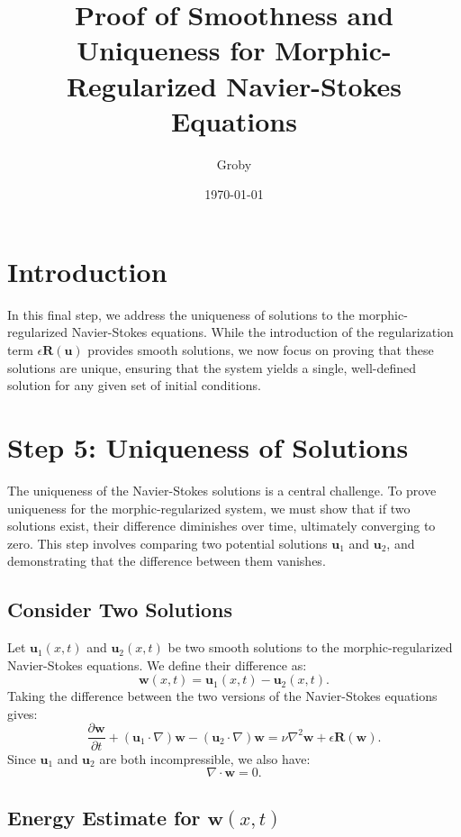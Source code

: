 \documentclass{article}
\title{Proof of Smoothness and Uniqueness for Morphic-Regularized Navier-Stokes Equations}
\author{Groby}
\date{\today}
\begin{document}
\maketitle

\section*{Introduction}

In this final step, we address the uniqueness of solutions to the morphic-regularized Navier-Stokes equations. While the introduction of the regularization term \( \epsilon \mathbf{R}(\mathbf{u}) \) provides smooth solutions, we now focus on proving that these solutions are unique, ensuring that the system yields a single, well-defined solution for any given set of initial conditions.

\section*{Step 5: Uniqueness of Solutions}

The uniqueness of the Navier-Stokes solutions is a central challenge. To prove uniqueness for the morphic-regularized system, we must show that if two solutions exist, their difference diminishes over time, ultimately converging to zero. This step involves comparing two potential solutions \( \mathbf{u}_1 \) and \( \mathbf{u}_2 \), and demonstrating that the difference between them vanishes.

\subsection*{Consider Two Solutions}

Let \( \mathbf{u}_1(x,t) \) and \( \mathbf{u}_2(x,t) \) be two smooth solutions to the morphic-regularized Navier-Stokes equations. We define their difference as:
\[
\mathbf{w}(x,t) = \mathbf{u}_1(x,t) - \mathbf{u}_2(x,t).
\]
Taking the difference between the two versions of the Navier-Stokes equations gives:
\[
\frac{\partial \mathbf{w}}{\partial t} + (\mathbf{u}_1 \cdot \nabla) \mathbf{w} - (\mathbf{u}_2 \cdot \nabla) \mathbf{w} = \nu \nabla^2 \mathbf{w} + \epsilon \mathbf{R}(\mathbf{w}).
\]
Since \( \mathbf{u}_1 \) and \( \mathbf{u}_2 \) are both incompressible, we also have:
\[
\nabla \cdot \mathbf{w} = 0.
\]

\subsection*{Energy Estimate for \( \mathbf{w}(x,t) \)}
\end{document}
